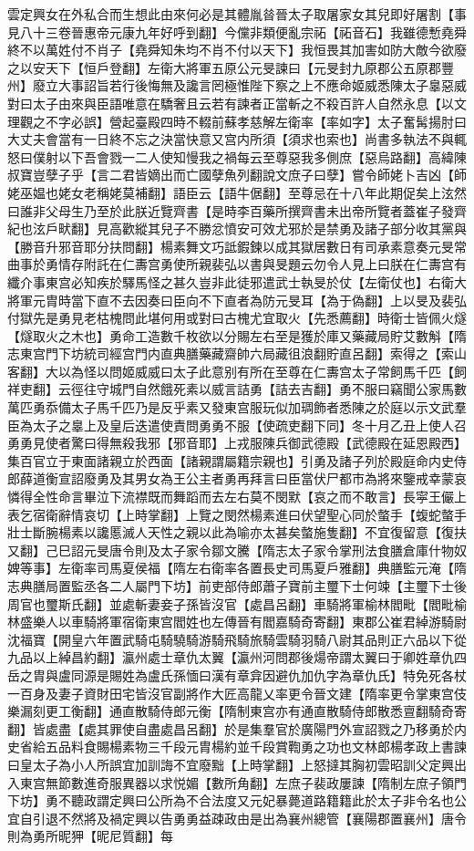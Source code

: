 雲定興女在外私合而生想此由來何必是其體胤㫺晉太子取屠家女其兒即好屠割【事見八十三卷晉惠帝元康九年好呼到翻】今儻非類便亂宗祏【祏音石】我雖德慙堯舜終不以萬姓付不肖子【堯舜知朱均不肖不付以天下】我恒畏其加害如防大敵今欲廢之以安天下【恒戶登翻】左衛大將軍五原公元旻諫曰【元旻封九原郡公五原郡豐州】廢立大事詔旨若行後悔無及讒言罔極惟陛下察之上不應命姬威悉陳太子辠惡威對曰太子由來與臣語唯意在驕奢且云若有諫者正當斬之不殺百許人自然永息【以文理觀之不字必誤】營起臺殿四時不輟前蘇孝慈解左衛率【率如字】太子奮髯揚肘曰大丈夫會當有一日終不忘之決當快意又宫内所須【須求也索也】尚書多執法不與輒怒曰僕射以下吾會戮一二人使知慢我之禍每云至尊惡我多側庶【惡烏路翻】高緯陳叔寶豈孽子乎【言二君皆嫡出而亡國孽魚列翻說文庶子曰孽】嘗令師姥卜吉凶【師姥巫媪也姥女老稱姥莫補翻】語臣云【語牛倨翻】至尊忌在十八年此期促矣上泫然曰誰非父母生乃至於此朕近覽齊書【是時李百藥所撰齊書未出帝所覽者蓋崔子發齊紀也泫戶畎翻】見高歡縱其兒子不勝忿憤安可效尤邪於是禁勇及諸子部分收其黨與【勝音升邪音耶分扶問翻】楊素舞文巧詆鍜鍊以成其獄居數日有司承素意奏元旻常曲事於勇情存附託在仁夀宫勇使所親裴弘以書與旻題云勿令人見上曰朕在仁夀宫有纖介事東宫必知疾於驛馬怪之甚久豈非此徒邪遣武士執旻於仗【左衛仗也】右衛大將軍元胄時當下直不去因奏曰臣向不下直者為防元旻耳【為于偽翻】上以旻及裴弘付獄先是勇見老枯槐問此堪何用或對曰古槐尤宜取火【先悉薦翻】時衛士皆佩火燧【燧取火之木也】勇命工造數千枚欲以分賜左右至是獲於庫又藥藏局貯艾數斛【隋志東宫門下坊統司經宫門内直典膳藥藏齋帥六局藏徂浪翻貯直呂翻】索得之【索山客翻】大以為怪以問姬威威曰太子此意别有所在至尊在仁夀宫太子常飼馬千匹【飼祥吏翻】云徑往守城門自然餓死素以威言詰勇【詰去吉翻】勇不服曰竊聞公家馬數萬匹勇忝備太子馬千匹乃是反乎素又發東宫服玩似加琱飾者悉陳之於庭以示文武羣臣為太子之辠上及皇后迭遣使責問勇勇不服【使疏吏翻下同】冬十月乙丑上使人召勇勇見使者驚曰得無殺我邪【邪音耶】上戎服陳兵御武德殿【武德殿在延恩殿西】集百官立于東面諸親立於西面【諸親謂屬籍宗親也】引勇及諸子列於殿庭命内史侍郎薛道衡宣詔廢勇及其男女為王公主者勇再拜言曰臣當伏尸都市為將來鑒戒幸蒙哀憐得全性命言畢泣下流襟既而舞蹈而去左右莫不閔默【哀之而不敢言】長寜王儼上表乞宿衛辭情哀切【上時掌翻】上覽之閔然楊素進曰伏望聖心同於螫手【蝮蛇螫手壯士斷腕楊素以讒慝滅人天性之親以此為喻亦太甚矣螫施隻翻】不宜復留意【復扶又翻】己巳詔元旻唐令則及太子家令鄒文騰【隋志太子家令掌刑法食膳倉庫什物奴婢等事】左衛率司馬夏侯福【隋左右衛率各置長史司馬夏戶雅翻】典膳監元淹【隋志典膳局置監丞各二人屬門下坊】前吏部侍郎蕭子寶前主璽下士何竦【主璽下士後周官也璽斯氏翻】並處斬妻妾子孫皆沒官【處昌呂翻】車騎將軍榆林閻毗【閻毗榆林盛樂人以車騎將軍宿衛東宫閻姓也左傳晉有閻嘉騎奇寄翻】東郡公崔君綽游騎尉沈福寶【開皇六年置武騎屯騎驍騎游騎飛騎旅騎雲騎羽騎八尉其品則正六品以下從九品以上綽昌約翻】瀛州處士章仇太翼【瀛州河問郡後煬帝謂太翼曰于卿姓章仇四岳之胄與盧同源是賜姓為盧氏孫愐曰漢有章弇因避仇加仇字為章仇氏】特免死各杖一百身及妻子資財田宅皆沒官副將作大匠高龍乂率更令晉文建【隋率更令掌東宫伎樂漏刻更工衡翻】通直散騎侍郎元衡【隋制東宫亦有通直散騎侍郎散悉亶翻騎奇寄翻】皆處盡【處其罪使自盡處昌呂翻】於是集羣官於廣陽門外宣詔戮之乃移勇於内史省給五品料食賜楊素物三千段元胄楊約並千段賞鞫勇之功也文林郎楊孝政上書諫曰皇太子為小人所誤宜加訓誨不宜廢黜【上時掌翻】上怒撻其胸初雲昭訓父定興出入東宫無節數進奇服異器以求悦媚【數所角翻】左庶子裴政屢諫【隋制左庶子領門下坊】勇不聽政謂定興曰公所為不合法度又元妃暴薨道路籍籍此於太子非令名也公宜自引退不然將及禍定興以告勇勇益疎政由是出為襄州總管【襄陽郡置襄州】唐令則為勇所昵狎【昵尼質翻】每